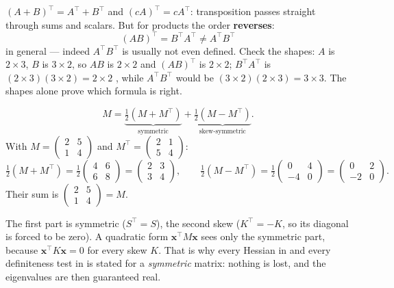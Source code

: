 \begin{worked}
$(A+B)^{\!\top}=A^{\!\top}+B^{\!\top}$ and $(cA)^{\!\top}=cA^{\!\top}$:
transposition passes straight through sums and scalars. But for products the
order \textbf{reverses}:
\[
  (AB)^{\!\top}=B^{\!\top}A^{\!\top}\neq A^{\!\top}B^{\!\top}
\]
in general --- indeed $A^{\!\top}B^{\!\top}$ is usually not even defined.
Check the shapes: $A$ is $2\times3$, $B$ is $3\times2$, so $AB$ is
$2\times2$ and $(AB)^{\!\top}$ is $2\times2$; $B^{\!\top}A^{\!\top}$ is
$(2\times3)(3\times2)=2\times2$ \checkmark, while $A^{\!\top}B^{\!\top}$
would be $(3\times2)(2\times3)=3\times3$. The shapes alone prove which
formula is right.

\[
  M=\underbrace{\tfrac12(M+M^{\!\top})}_{\text{symmetric}}
   +\underbrace{\tfrac12(M-M^{\!\top})}_{\text{skew-symmetric}} .
\]
With $M=\begin{pmatrix}2&5\\1&4\end{pmatrix}$ and
$M^{\!\top}=\begin{pmatrix}2&1\\5&4\end{pmatrix}$:
\[
  \tfrac12(M+M^{\!\top})=\tfrac12\begin{pmatrix}4&6\\6&8\end{pmatrix}
  =\begin{pmatrix}2&3\\3&4\end{pmatrix},
  \qquad
  \tfrac12(M-M^{\!\top})=\tfrac12\begin{pmatrix}0&4\\-4&0\end{pmatrix}
  =\begin{pmatrix}0&2\\-2&0\end{pmatrix} .
\]
Their sum is $\begin{pmatrix}2&5\\1&4\end{pmatrix}=M$. \checkmark

The first part is symmetric ($S^{\!\top}=S$), the second skew
($K^{\!\top}=-K$, so its diagonal is forced to be zero). A quadratic form
$\mathbf x^{\!\top}M\mathbf x$ sees only the symmetric part, because
$\mathbf x^{\!\top}K\mathbf x=0$ for every skew $K$. That is why every
Hessian in  and every definiteness test in  is stated for a
\emph{symmetric} matrix: nothing is lost, and the eigenvalues are then
guaranteed real.
\end{worked}


